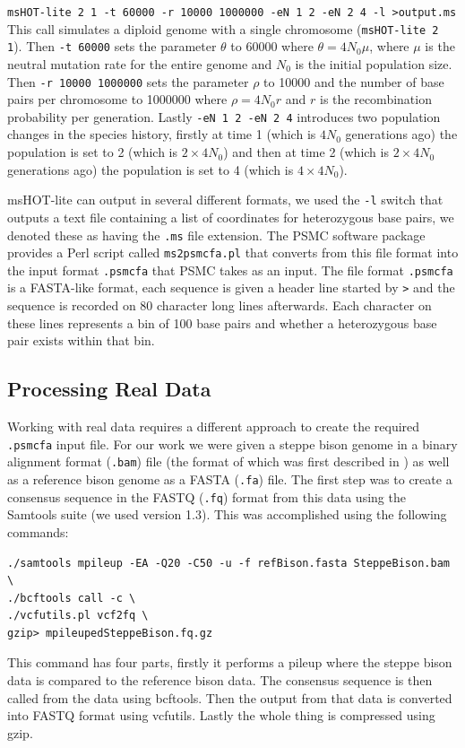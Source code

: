 \documentclass[11pt,a4paper]{article}
\begin{document}
\verb|msHOT-lite 2 1 -t 60000 -r 10000 1000000 -eN 1 2 -eN 2 4 -l >output.ms| 
This call simulates a diploid genome with a single chromosome (\verb|msHOT-lite 2 1|). Then \verb|-t 60000| sets the parameter $\theta$ to 60000 where $\theta=4N_0\mu$, where $\mu$ is the neutral mutation rate for the entire genome and $N_0$ is the initial population size. Then \verb|-r 10000 1000000| sets the parameter $\rho$ to 10000 and the number of base pairs per chromosome to 1000000 where $\rho=4N_0r$ and $r$ is the recombination probability per generation. Lastly \verb|-eN 1 2 -eN 2 4| introduces two population changes in the species history, firstly at time 1 (which is $4N_0$ generations ago) the population is set to 2 (which is $2\times4N_0$) and then at time 2 (which is $2\times4N_0$ generations ago) the population is set to 4 (which is $4\times4N_0$).

msHOT-lite can output in several different formats, we used the \verb|-l| switch that outputs a text file containing a list of coordinates for heterozygous base pairs, we denoted these as having the \verb|.ms| file extension. The PSMC software package \cite{li2011inference} provides a Perl script called \verb|ms2psmcfa.pl| that converts from this file format into the input format \verb|.psmcfa| that PSMC takes as an input. The file format \verb|.psmcfa| is a FASTA-like format, each sequence is given a header line started by \verb|>| and the sequence is recorded on 80 character long lines afterwards. Each character on these lines represents a bin of 100 base pairs and whether a heterozygous base pair exists within that bin.

\subsection{Processing Real Data}
Working with real data requires a different approach to create the required \verb|.psmcfa| input file. For our work we were given a steppe bison genome in a binary alignment format (\verb|.bam|) file (the format of which was first described in \cite{li2009sequence}) as well as a reference bison genome as a FASTA (\verb|.fa|) file. The first step was to create a consensus sequence in the FASTQ (\verb|.fq|) format from this data using the Samtools suite (we used version 1.3). This was accomplished using the following commands:
\begin{verbatim}
./samtools mpileup -EA -Q20 -C50 -u -f refBison.fasta SteppeBison.bam \ 
./bcftools call -c \
./vcfutils.pl vcf2fq \
gzip> mpileupedSteppeBison.fq.gz
\end{verbatim}
This command has four parts, firstly it performs a pileup where the steppe bison data is compared to the reference bison data. The consensus sequence is then called from the data using bcftools. Then the output from that data is converted into FASTQ format using vcfutils. Lastly the whole thing is compressed using gzip. 
\end{document}
